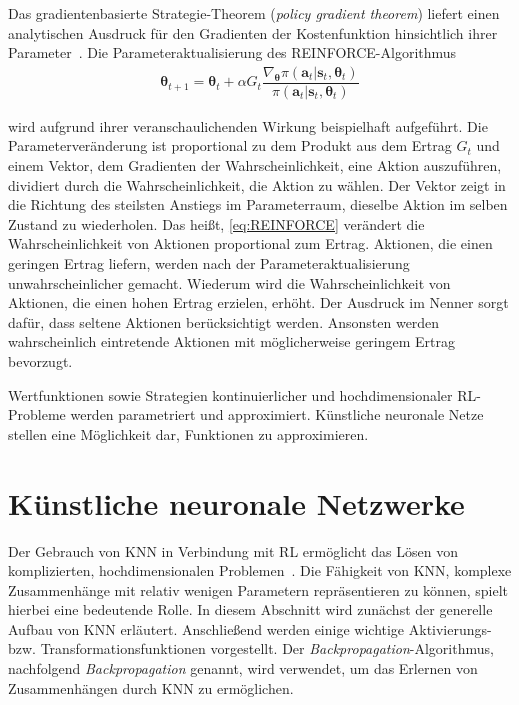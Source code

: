 Das gradientenbasierte Strategie-Theorem (\textit{policy gradient theorem}) liefert einen analytischen Ausdruck für den Gradienten der Kostenfunktion hinsichtlich ihrer Parameter~\cite{SB98}. Die Parameteraktualisierung des REINFORCE-Algorithmus~\cite{Wil92} 
\begin{align}
\bm{\theta}_{t+1} = \bm{\theta}_t + \alpha G_t 
\dfrac{\nabla_{\bm{\theta}} \pi(\bm{a}_t|\bm{s}_t, \bm{\theta}_t)}{\pi(\bm{a}_t|\bm{s}_t, \bm{\theta}_t)}
\label{eq:REINFORCE}
\end{align}

wird aufgrund ihrer veranschaulichenden Wirkung beispielhaft aufgeführt. Die Parameterveränderung ist proportional zu dem Produkt aus dem Ertrag $G_t$ und einem Vektor, dem Gradienten der Wahrscheinlichkeit, eine Aktion auszuführen, dividiert durch die Wahrscheinlichkeit, die Aktion zu wählen. Der Vektor zeigt in die Richtung des steilsten Anstiegs im Parameterraum, dieselbe Aktion im selben Zustand zu wiederholen. Das heißt, \eqref{eq:REINFORCE} verändert die Wahrscheinlichkeit von Aktionen proportional zum Ertrag. Aktionen, die einen geringen Ertrag liefern, werden nach der Parameteraktualisierung unwahrscheinlicher gemacht. Wiederum wird die Wahrscheinlichkeit von Aktionen, die einen hohen Ertrag erzielen, erhöht. Der Ausdruck im Nenner sorgt dafür, dass seltene Aktionen berücksichtigt werden. Ansonsten werden wahrscheinlich eintretende Aktionen mit möglicherweise geringem Ertrag bevorzugt. \newline

Wertfunktionen sowie Strategien kontinuierlicher und hochdimensionaler RL-Probleme werden parametriert und approximiert. Künstliche neuronale Netze stellen eine Möglichkeit dar, Funktionen zu approximieren.





\section{Künstliche neuronale Netzwerke}
\label{sec:knn}

Der Gebrauch von KNN in Verbindung mit RL ermöglicht das Lösen von komplizierten, hochdimensionalen Problemen~\cite{ADBB17}. Die Fähigkeit von KNN, komplexe Zusammenhänge mit relativ wenigen Parametern repräsentieren zu können, spielt hierbei eine bedeutende Rolle.  
In diesem Abschnitt wird zunächst der generelle Aufbau von KNN erläutert. Anschließend werden einige wichtige Aktivierungs- bzw. Transformationsfunktionen vorgestellt. Der \textit{Backpropagation}-Algorithmus, nachfolgend \textit{Backpropagation} genannt, wird verwendet, um das Erlernen von Zusammenhängen durch KNN zu ermöglichen. 






